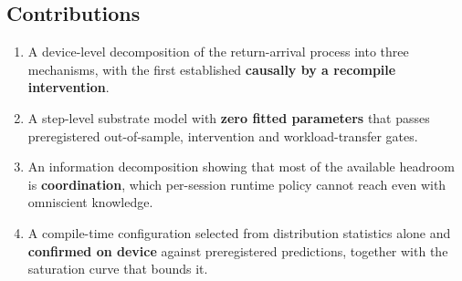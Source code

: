 \subsection{Contributions}

\begin{enumerate}
  \item A device-level decomposition of the return-arrival process into three mechanisms, with the first established \textbf{causally by a recompile intervention}.
  \item A step-level substrate model with \textbf{zero fitted parameters} that passes preregistered out-of-sample, intervention and workload-transfer gates.
  \item An information decomposition showing that most of the available headroom is \textbf{coordination}, which per-session runtime policy cannot reach even with omniscient knowledge.
  \item A compile-time configuration selected from distribution statistics alone and \textbf{confirmed on device} against preregistered predictions, together with the saturation curve that bounds it.
\end{enumerate}
